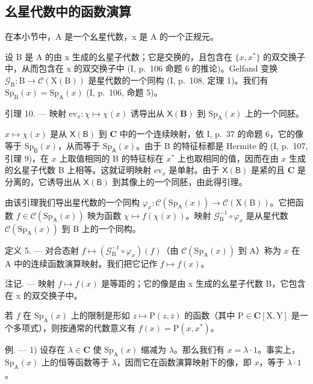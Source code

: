 \subsection{幺星代数中的函数演算}

在本小节中，A 是一个幺星代数，x 是 A 的一个正规元。

设 B 是 A 的由 x 生成的幺星子代数；它是交换的，且包含在 \(\{x, x^{*}\}\) 的双交换子中，从而包含在 x 的双交换子中 (I, p.~106 命题 6 的推论)。Gelfand 变换 \(\mathcal{G}_{\mathrm{B}}: \mathrm{B} \to \mathcal{C}(\mathrm{X}(\mathrm{B}))\) 是星代数的一个同构 (I, p.~108, 定理 1)。我们有 \(\mathrm{Sp}_{\mathrm{B}}(x) = \mathrm{Sp}_{\mathrm{A}}(x)\) (I, p.~106, 命题 5)。

引理 10. --- 映射 \(\mathrm{ev}_x\colon \chi \mapsto \chi (x)\) 诱导出从 \(\mathsf{X}(\mathbf{B})\) 到 \(\mathrm{Sp}_{\mathrm{A}}(x)\) 上的一个同胚。

\(x \mapsto \chi(x)\) 是从 \(\mathsf{X}(\mathsf{B})\) 到 \(\mathbf{C}\) 中的一个连续映射，依 I, p.~37 的命题 6，它的像等于 \(\mathrm{Sp}_{\mathsf{B}}(x)\)，从而等于 \(\mathrm{Sp}_{\mathsf{A}}(x)\)。由于 B 的特征标都是 Hermite 的 (I, p.~107, 引理 9)，在 \(x\) 上取值相同的 B 的特征标在 \(x^{*}\) 上也取相同的值，因而在由 \(x\) 生成的幺星子代数 B 上相等。这就证明映射 \(\mathrm{ev}_x\) 是单射。由于 \(\mathsf{X}(\mathsf{B})\) 是紧的且 \(\mathbf{C}\) 是分离的，它诱导出从 \(\mathsf{X}(\mathsf{B})\) 到其像上的一个同胚，由此得引理。

由该引理我们导出星代数的一个同构 \(\varphi_x\colon \mathcal{C}(\mathrm{Sp}_{\mathrm{A}}(x))\to \mathcal{C}(\mathrm{X(B)})\)。它把函数 \(f\in \mathcal{C}(\mathrm{Sp}_{\mathrm{A}}(x))\) 映为函数 \(\chi \mapsto f(\chi (x))\)。映射 \(\mathcal{G}_{\mathrm{B}}^{-1}\circ \varphi_{x}\) 是从星代数 \(\mathcal{C}(\mathrm{Sp}_{\mathrm{A}}(x))\) 到 B 上的一个同构。

定义 5. --- 对合态射 \(f \mapsto (\mathcal{G}_{\mathrm{B}}^{-1} \circ \varphi_x)(f)\)（由 \(\mathcal{C}(\mathrm{Sp}_{\mathrm{A}}(x))\) 到 A）称为 \(x\) 在 A 中的连续函数演算映射。我们把它记作 \(f \mapsto f(x)\)。

注记. --- 映射 \(f \mapsto f(x)\) 是等距的；它的像是由 x 生成的幺星子代数 B，它包含在 x 的双交换子中。

若 \(f\) 在 \(\mathrm{Sp}_{\mathrm{A}}(x)\) 上的限制是形如 \(z \mapsto \mathrm{P}(z, \overline{z})\) 的函数（其中 \(\mathrm{P} \in \mathbf{C}[\mathrm{X}, \mathrm{Y}]\) 是一个多项式），则按通常的代数意义有 \(f(x) = \mathrm{P}(x, x^{*})\)。

例. --- 1) 设存在 \(\lambda \in \mathbf{C}\) 使 \(\mathrm{Sp}_{\mathrm{A}}(x)\) 缩减为 \(\lambda\)。那么我们有 \(x = \lambda \cdot 1\)。事实上，\(\mathrm{Sp}_{\mathrm{A}}(x)\) 上的恒等函数等于 \(\lambda\)，因而它在函数演算映射下的像，即 \(x\)，等于 \(\lambda \cdot 1\)。

